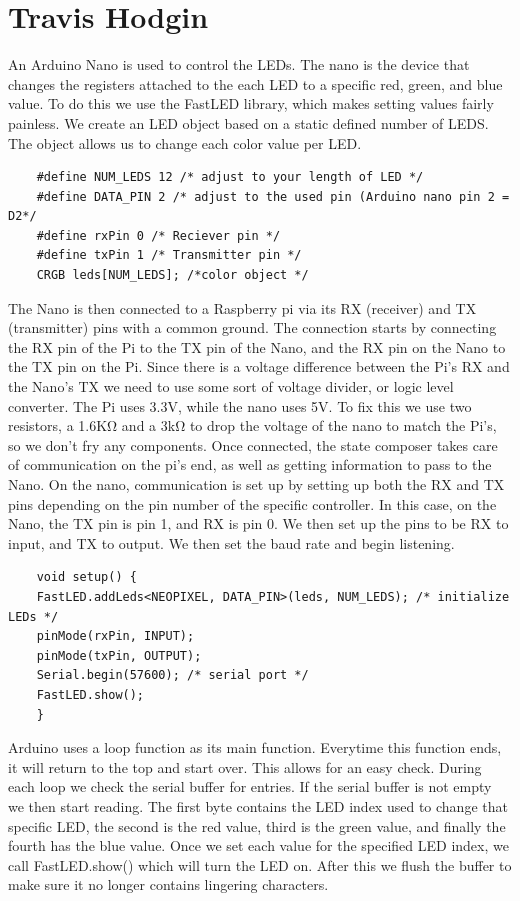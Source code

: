 \documentclass[onecolumn, draftclsnofoot,10pt, compsoc]{IEEEtran}
\begin{document}
	\section{Travis Hodgin}
	An Arduino Nano is used to control the LEDs. The nano is the device that
	changes the registers attached to the each LED to a specific red, green,
	and blue value. To do this we use the FastLED library, which makes setting
	values fairly painless. We create an LED object based on a static defined
	number of LEDS. The object allows us to change each color value
	per LED.
	\begin{lstlisting}
	#define NUM_LEDS 12 /* adjust to your length of LED */
	#define DATA_PIN 2 /* adjust to the used pin (Arduino nano pin 2 = D2*/
	#define rxPin 0 /* Reciever pin */
	#define txPin 1 /* Transmitter pin */
	CRGB leds[NUM_LEDS]; /*color object */
	\end{lstlisting}
	The Nano is then connected to a Raspberry pi via its RX (receiver)
	and TX (transmitter) pins with a common ground. The connection starts by
	connecting the RX pin of the Pi to the TX pin of the Nano, and the RX pin on
	the Nano to the TX pin on the Pi. Since there is a voltage difference between
	the Pi’s RX and the Nano’s TX we need to use some sort of voltage divider, or
	logic level converter. The Pi uses 3.3V, while the nano uses 5V. To fix this
	we use two resistors, a 1.6KΩ and a 3kΩ to drop the voltage of the nano to
	match the Pi’s, so we don’t fry any components. Once connected, the state composer
	takes care of communication on the pi’s end, as well as getting information to
	pass to the Nano. On the nano, communication is set up by setting up both the
	RX and TX pins depending on the pin number of the specific controller. In this
	case, on the Nano, the TX pin is pin 1, and RX is pin 0. We then set up the pins to be RX to input,
	and TX to output. We then set the baud rate and begin listening.
	\begin{lstlisting}
	void setup() {
  	FastLED.addLeds<NEOPIXEL, DATA_PIN>(leds, NUM_LEDS); /* initialize LEDs */
  	pinMode(rxPin, INPUT);
  	pinMode(txPin, OUTPUT);
  	Serial.begin(57600); /* serial port */
  	FastLED.show();
	}
	\end{lstlisting}

	\noindent Arduino uses a loop function as its main function. Everytime this function
	ends, it will return to the top and start over.  This allows for an easy check.
	During each loop we check the serial buffer for entries. If the serial buffer
	is not empty we then start reading. The first byte contains the LED index used
	to change that specific LED, the second is the red value, third is the green
	value, and finally the fourth has the blue value.  Once we set each value for
	the specified LED index, we call FastLED.show() which will turn the LED on.
	After this we flush the buffer to make sure it no longer contains lingering characters.
\end{document}
